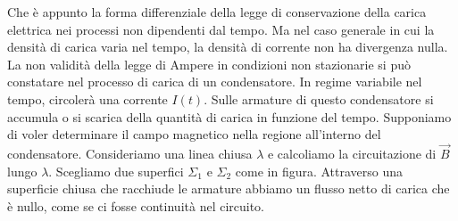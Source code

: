 Che è appunto la forma differenziale della legge di conservazione della carica elettrica nei processi non dipendenti dal tempo. Ma nel caso generale in cui la densità di carica varia nel tempo, la densità di corrente non ha divergenza nulla. La non validità della legge di Ampere in condizioni non stazionarie si può constatare nel processo di carica di un condensatore.
In regime variabile nel tempo, circolerà una corrente $I(t)$. Sulle armature di questo condensatore si accumula o si scarica della quantità di carica in funzione del tempo. Supponiamo di voler determinare il campo magnetico nella regione all'interno del condensatore. Consideriamo una linea chiusa $\lambda$ e calcoliamo la circuitazione di $\vec{B}$ lungo $\lambda$. Scegliamo due superfici $\Sigma_1$ e $\Sigma_2$ come in figura. Attraverso una superficie chiusa che racchiude le armature abbiamo un flusso netto di carica che è nullo, come se ci fosse continuità nel circuito.

